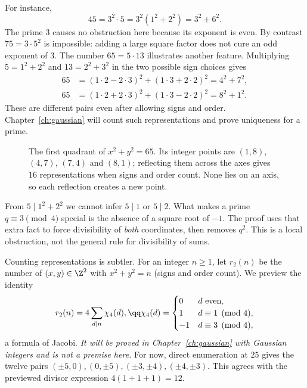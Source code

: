 For instance,
\[
45=3^2\cdot5=3^2(1^2+2^2)=3^2+6^2.
\]
The prime $3$ causes no obstruction here because its exponent is even. By contrast $75=3\cdot5^2$ is impossible: adding a large square factor does not cure an odd exponent of $3$. The number $65=5\cdot13$ illustrates another feature. Multiplying $5=1^2+2^2$ and $13=2^2+3^2$ in the two possible sign choices gives
\[
\begin{aligned}
65&=(1\cdot2-2\cdot3)^2+(1\cdot3+2\cdot2)^2=4^2+7^2,\\
65&=(1\cdot2+2\cdot3)^2+(1\cdot3-2\cdot2)^2=8^2+1^2.
\end{aligned}
\]
These are different pairs even after allowing signs and order. Chapter~\ref{ch:gaussian} will count such representations and prove uniqueness for a prime.

\begin{figure}[ht]
\centering
{}
\caption{The first quadrant of $x^2+y^2=65$. Its integer points are $(1,8)$, $(4,7)$, $(7,4)$ and $(8,1)$; reflecting them across the axes gives $16$ representations when signs and order count. None lies on an axis, so each reflection creates a new point.}
\label{fig:sixtyfive}
\end{figure}

\begin{reminder}
From $5\mid1^2+2^2$ we cannot infer $5\mid1$ or $5\mid2$. What makes a prime $q\equiv3\pmod4$ special is the absence of a square root of $-1$. The proof uses that extra fact to force divisibility of \emph{both} coordinates, then removes $q^2$. This is a local obstruction, not the general rule for divisibility of sums.
\end{reminder}

Counting representations is subtler. For an integer $n\ge1$, let $r_2(n)$ be the number of $(x,y)\in\Z^2$ with $x^2+y^2=n$ (signs and order count). We preview the identity
\[
\begin{gathered}r_2(n)=4\sum_{d\mid n}\chi_4(d),\qq\chi_4(d)=\begin{cases}0&d\text{ even},\\1&d\equiv1\pmod4,\\-1&d\equiv3\pmod4,\end{cases}\end{gathered}
\]
a formula of Jacobi. \emph{It will be proved in Chapter~\ref{ch:gaussian} with Gaussian integers and is not a premise here.} For now, direct enumeration at $25$ gives the twelve pairs $(\pm5,0),(0,\pm5),(\pm3,\pm4),(\pm4,\pm3)$. This agrees with the previewed divisor expression $4(1+1+1)=12$.

